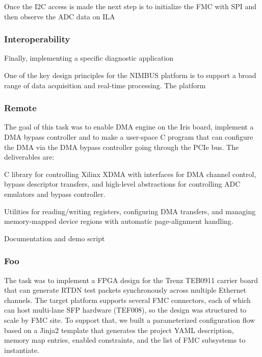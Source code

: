 \documentclass[preprint]{elsarticle}
\begin{document}
Once the I2C access is made the next step is to initialize the FMC with SPI and then observe the ADC data on ILA

\subsubsection{Interoperability}

Finally, implementing a specific diagnostic application


One of the key design principles for the NIMBUS platform is to support a broad range
of data acquisition and real-time processing.  The platform 

\subsubsection{Remote }

The goal of this task was to enable DMA engine on the Iris board, implement a DMA bypass controller and to make a user-space C program that can configure the DMA via the DMA bypass controller going through the PCIe bus. The deliverables are:

C library for controlling Xilinx XDMA with interfaces for DMA channel control, bypass descriptor transfers, and high-level abstractions for controlling ADC emulators and bypass controller.

Utilities for reading/writing registers, configuring DMA transfers, and managing memory-mapped device regions with automatic page-alignment handling.

Documentation and demo script

\subsubsection{Foo}

The task was to implement a FPGA design for the Trenz TEB0911 carrier board that can generate RTDN test packets synchronously across multiple Ethernet channels. The target platform supports several FMC connectors, each of which can host multi-lane SFP hardware (TEF008), so the design was structured to scale by FMC site. To support that, we built a parameterized configuration flow based on a Jinja2 template that generates the project YAML description, memory map entries, enabled constraints, and the list of FMC subsystems to instantiate. 
\end{document}
